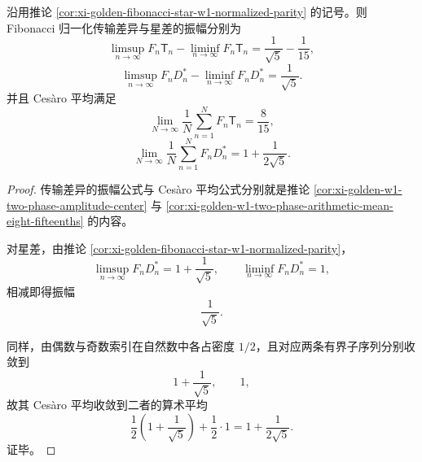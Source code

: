 \begin{corollary}\label{cor:xi-golden-fibonacci-star-w1-oscillation-cesaro}
沿用推论 \ref{cor:xi-golden-fibonacci-star-w1-normalized-parity} 的记号。则 Fibonacci 归一化传输差异与星差的振幅分别为
\[
\boxed{\;
\limsup_{n\to\infty}F_n\mathsf{T}_n
-
\liminf_{n\to\infty}F_n\mathsf{T}_n
=
\frac1{\sqrt5}-\frac1{15},\;}
\]
\[
\boxed{\;
\limsup_{n\to\infty}F_nD_n^\ast
-
\liminf_{n\to\infty}F_nD_n^\ast
=
\frac1{\sqrt5}.\;}
\]
并且 Ces\`aro 平均满足
\[
\boxed{\;
\lim_{N\to\infty}\frac1N\sum_{n=1}^N F_n\mathsf{T}_n
=
\frac{8}{15},\;}
\]
\[
\boxed{\;
\lim_{N\to\infty}\frac1N\sum_{n=1}^N F_nD_n^\ast
=
1+\frac{1}{2\sqrt5}.\;}
\]
\end{corollary}
\begin{proof}
传输差异的振幅公式与 Ces\`aro 平均公式分别就是推论
\ref{cor:xi-golden-w1-two-phase-amplitude-center} 与
\ref{cor:xi-golden-w1-two-phase-arithmetic-mean-eight-fifteenths} 的内容。

对星差，由推论 \ref{cor:xi-golden-fibonacci-star-w1-normalized-parity}，
\[
\limsup_{n\to\infty}F_nD_n^\ast=1+\frac1{\sqrt5},
\qquad
\liminf_{n\to\infty}F_nD_n^\ast=1,
\]
相减即得振幅
\[
\frac1{\sqrt5}.
\]

同样，由偶数与奇数索引在自然数中各占密度 \(1/2\)，且对应两条有界子序列分别收敛到
\[
1+\frac1{\sqrt5},
\qquad
1,
\]
故其 Ces\`aro 平均收敛到二者的算术平均
\[
\frac12\left(1+\frac1{\sqrt5}\right)+\frac12\cdot 1
=
1+\frac{1}{2\sqrt5}.
\]
证毕。
\end{proof}

